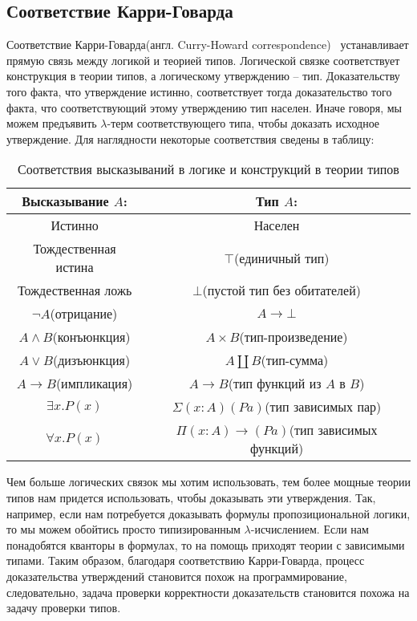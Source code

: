 \subsection{Соответствие Карри-Говарда}
Соответствие Карри-Говарда(англ. Curry-Howard correspondence)~\cite{howard1980formulae} устанавливает прямую связь между логикой и теорией типов. Логической связке соответствует конструкция в теории типов, а логическому утверждению -- тип. Доказательству того факта, что утверждение истинно, соответствует тогда доказательство того факта, что соответствующий этому утверждению тип населен. Иначе говоря, мы можем предъявить $\lambda$-терм соответствующего типа, чтобы доказать исходное утверждение. Для наглядности некоторые соответствия сведены в таблицу:

\begin{table}[H]
  \centering
  \begin{tabular}{| c | c |}
    \hline
    Высказывание $A$: & Тип $A$: \\
    \hline
    Истинно & Населен \\
    \hline
    Тождественная истина & $\top$(единичный тип) \\
    \hline
    Тождественная ложь & $\bot$(пустой тип без обитателей) \\
    \hline
    $\lnot A$(отрицание) & $A \to \bot$ \\
    \hline
    $A \land B$(конъюнкция) & $A \times B$(тип-произведение) \\
    \hline
    $A \lor B$(дизъюнкция) & $A \coprod B$(тип-сумма) \\
    \hline
    $A \to B$(импликация) & $A \to B$(тип функций из $A$ в $B$) \\
    \hline
    $\exists x.P(x)$ & $\Sigma (x : A) (P a)$(тип зависимых пар) \\
    \hline
    $\forall x.P(x)$ & $\Pi (x : A) \to (P a)$(тип зависимых функций) \\
    \hline
  \end{tabular}
  \caption{Соответствия высказываний в логике и конструкций в теории типов}
\end{table}

Чем больше логических связок мы хотим использовать, тем более мощные теории типов  нам придется использовать, чтобы доказывать эти утверждения. Так, например, если нам потребуется доказывать формулы пропозициональной логики, то мы можем обойтись просто типизированным $\lambda$-исчислением. Если нам понадобятся кванторы в формулах, то на помощь приходят теории с зависимыми типами. Таким образом, благодаря соответствию Карри-Говарда, процесс доказательства утверждений становится похож на программирование, следовательно, задача проверки корректности доказательств становится похожа на задачу проверки типов.

